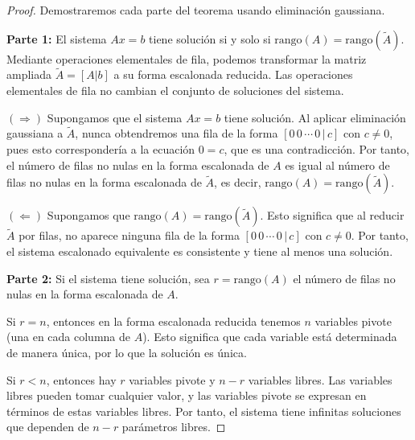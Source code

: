 \begin{proof}
Demostraremos cada parte del teorema usando eliminación gaussiana.

\textbf{Parte 1:} El sistema $Ax = b$ tiene solución si y solo si $\text{rango}(A) = \text{rango}(\tilde{A})$. Mediante operaciones elementales de fila, podemos transformar la matriz ampliada $\tilde{A} = [A|b]$ a su forma escalonada reducida. Las operaciones elementales de fila no cambian el conjunto de soluciones del sistema.

$(\Rightarrow)$ Supongamos que el sistema $Ax = b$ tiene solución. Al aplicar eliminación gaussiana a $\tilde{A}$, nunca obtendremos una fila de la forma $[0 \, 0 \, \cdots \, 0 \, | \, c]$ con $c \neq 0$, pues esto correspondería a la ecuación $0 = c$, que es una contradicción. Por tanto, el número de filas no nulas en la forma escalonada de $A$ es igual al número de filas no nulas en la forma escalonada de $\tilde{A}$, es decir, $\text{rango}(A) = \text{rango}(\tilde{A})$.

$(\Leftarrow)$ Supongamos que $\text{rango}(A) = \text{rango}(\tilde{A})$. Esto significa que al reducir $\tilde{A}$ por filas, no aparece ninguna fila de la forma $[0 \, 0 \, \cdots \, 0 \, | \, c]$ con $c \neq 0$. Por tanto, el sistema escalonado equivalente es consistente y tiene al menos una solución.

\textbf{Parte 2:} Si el sistema tiene solución, sea $r = \text{rango}(A)$ el número de filas no nulas en la forma escalonada de $A$.

Si $r = n$, entonces en la forma escalonada reducida tenemos $n$ variables pivote (una en cada columna de $A$). Esto significa que cada variable está determinada de manera única, por lo que la solución es única.

Si $r < n$, entonces hay $r$ variables pivote y $n - r$ variables libres. Las variables libres pueden tomar cualquier valor, y las variables pivote se expresan en términos de estas variables libres. Por tanto, el sistema tiene infinitas soluciones que dependen de $n - r$ parámetros libres.
\end{proof}

